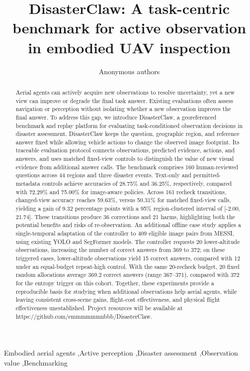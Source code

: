 \documentclass[final,5p,times,twocolumn]{elsarticle}
\begin{document}
\begin{frontmatter}
\title{DisasterClaw: A task-centric benchmark for active observation in embodied UAV inspection}
\author{Anonymous authors}
\begin{abstract}
Aerial agents can actively acquire new observations to resolve uncertainty, yet a new view can improve or degrade the final task answer. Existing evaluations often assess navigation or perception without isolating whether a new observation improves the final answer. To address this gap, we introduce DisasterClaw, a georeferenced benchmark and replay platform for evaluating task-conditioned observation decisions in disaster assessment. DisasterClaw keeps the question, geographic region, and reference answer fixed while allowing vehicle actions to change the observed image footprint. Its traceable evaluation protocol connects observations, predicted evidence, actions, and answers, and uses matched fixed-view controls to distinguish the value of new visual evidence from additional answer calls. The benchmark comprises 160 human-reviewed questions across 44 regions and three disaster events. Text-only and permitted-metadata controls achieve accuracies of 28.75\% and 36.25\%, respectively, compared with 72.29\% and 75.00\% for image-aware policies. Across 161 recheck transitions, changed-view accuracy reaches 59.63\%, versus 50.31\% for matched fixed-view calls, yielding a gain of 9.32 percentage points with a 95\% region-clustered interval of [-2.00, 21.74]. These transitions produce 36 corrections and 21 harms, highlighting both the potential benefits and risks of re-observation. An additional offline case study applies a single-temporal adaptation of the controller to 409 eligible image pairs from MESSI, using existing YOLO and SegFormer models. The controller requests 20 lower-altitude observations, increasing the number of correct answers from 369 to 372; on these triggered cases, lower-altitude observations yield 15 correct answers, compared with 12 under an equal-budget repeat-high control. With the same 20-recheck budget, 20 fixed random allocations average 369.2 correct answers (range 367--371), compared with 372 for the entropy trigger on this cohort. Together, these experiments provide a reproducible basis for studying when additional observations help aerial agents, while leaving consistent cross-scene gains, flight-cost effectiveness, and physical flight effectiveness unestablished. Project resources will be available at https://github.com/emmmmmmnbbb/DisasterClaw.
\end{abstract}
\begin{keyword}
Embodied aerial agents \sep Active perception \sep Disaster assessment \sep Observation value \sep Benchmarking
\end{keyword}
\end{frontmatter}
\end{document}
